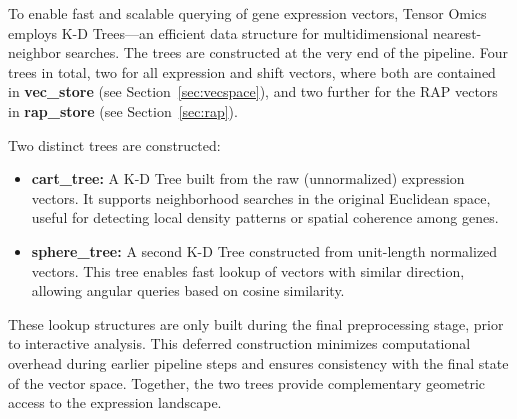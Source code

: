         To enable fast and scalable querying of gene expression vectors, Tensor Omics
        employs K-D Trees—an efficient data structure for multidimensional
        nearest-neighbor searches. The trees are constructed at the very end of the
        pipeline. Four trees in total, two for all expression and shift vectors, where
        both are contained in \textbf{vec\_store} (see Section~\ref{sec:vecspace}), and two
        further for the RAP vectors in \textbf{rap\_store} (see Section~\ref{sec:rap}).

        Two distinct trees are constructed:

        \begin{itemize}
            \item \textbf{cart\_tree:} A K-D Tree built from the raw (unnormalized) expression vectors. It supports neighborhood searches in the original Euclidean space, useful for detecting local density patterns or spatial coherence among genes.
            
            \item \textbf{sphere\_tree:} A second K-D Tree constructed from unit-length normalized vectors. This tree enables fast lookup of vectors with similar direction, allowing angular queries based on cosine similarity.
        \end{itemize}

        These lookup structures are only built during the final preprocessing stage, prior to interactive analysis. This deferred construction minimizes computational overhead during earlier pipeline steps and ensures consistency with the final state of the vector space. Together, the two trees provide complementary geometric access to the expression landscape.